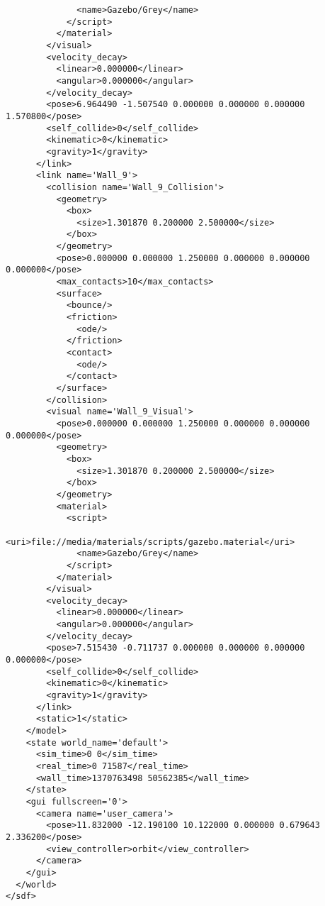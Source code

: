 \begin{lstlisting}
              <name>Gazebo/Grey</name>
            </script>
          </material>
        </visual>
        <velocity_decay>
          <linear>0.000000</linear>
          <angular>0.000000</angular>
        </velocity_decay>
        <pose>6.964490 -1.507540 0.000000 0.000000 0.000000 1.570800</pose>
        <self_collide>0</self_collide>
        <kinematic>0</kinematic>
        <gravity>1</gravity>
      </link>
      <link name='Wall_9'>
        <collision name='Wall_9_Collision'>
          <geometry>
            <box>
              <size>1.301870 0.200000 2.500000</size>
            </box>
          </geometry>
          <pose>0.000000 0.000000 1.250000 0.000000 0.000000 0.000000</pose>
          <max_contacts>10</max_contacts>
          <surface>
            <bounce/>
            <friction>
              <ode/>
            </friction>
            <contact>
              <ode/>
            </contact>
          </surface>
        </collision>
        <visual name='Wall_9_Visual'>
          <pose>0.000000 0.000000 1.250000 0.000000 0.000000 0.000000</pose>
          <geometry>
            <box>
              <size>1.301870 0.200000 2.500000</size>
            </box>
          </geometry>
          <material>
            <script>
              <uri>file://media/materials/scripts/gazebo.material</uri>
              <name>Gazebo/Grey</name>
            </script>
          </material>
        </visual>
        <velocity_decay>
          <linear>0.000000</linear>
          <angular>0.000000</angular>
        </velocity_decay>
        <pose>7.515430 -0.711737 0.000000 0.000000 0.000000 0.000000</pose>
        <self_collide>0</self_collide>
        <kinematic>0</kinematic>
        <gravity>1</gravity>
      </link>
      <static>1</static>
    </model>
    <state world_name='default'>
      <sim_time>0 0</sim_time>
      <real_time>0 71587</real_time>
      <wall_time>1370763498 50562385</wall_time>
    </state>
    <gui fullscreen='0'>
      <camera name='user_camera'>
        <pose>11.832000 -12.190100 10.122000 0.000000 0.679643 2.336200</pose>
        <view_controller>orbit</view_controller>
      </camera>
    </gui>
  </world>
</sdf>
\end{lstlisting}

